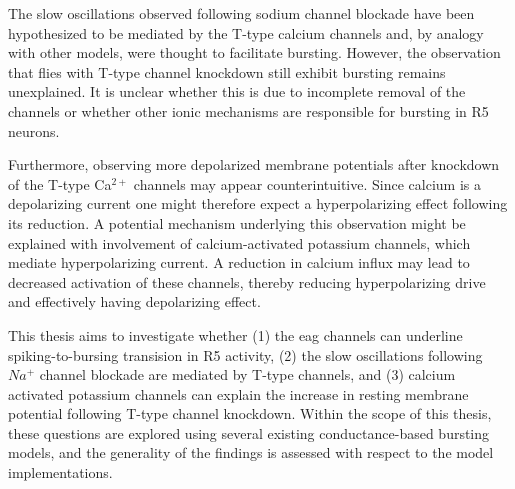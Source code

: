 \documentclass[../main.tex]{subfiles}
\begin{document}
The slow oscillations observed following sodium channel blockade have been hypothesized to be mediated by the T-type calcium channels and, by analogy with other models, were thought to facilitate bursting. However, the observation that flies with T-type channel knockdown still exhibit bursting remains unexplained. It is unclear whether this is due to incomplete removal of the channels or whether other ionic mechanisms are responsible for bursting in R5 neurons.

Furthermore, observing more depolarized membrane potentials after knockdown of the T-type Ca$^{2+}$ channels may appear counterintuitive. Since calcium is a depolarizing current  one might therefore expect a hyperpolarizing effect following its reduction. A potential mechanism underlying this observation might be explained with involvement of calcium-activated potassium channels, which mediate hyperpolarizing current. A reduction in calcium influx may lead to decreased activation of these channels, thereby reducing hyperpolarizing drive and effectively having depolarizing effect.

This thesis aims to investigate whether (1) the \gls{eag} channels can underline spiking-to-bursing transision in R5 activity, (2) the slow oscillations following $Na^+$ channel blockade are mediated by T-type channels, and (3) calcium activated potassium channels can explain the increase in resting membrane potential following T-type channel knockdown. Within the scope of this thesis, these questions are explored using several existing conductance-based bursting models, and the generality of the findings is assessed with respect to the model implementations.



\end{document}
